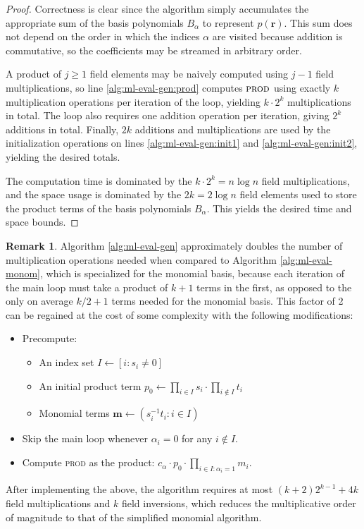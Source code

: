 \documentclass[12pt]{article}
\theoremstyle{plain}
\newcounter{documentcounter}
\theoremstyle{definition}
\newtheorem{remark}[documentcounter]{Remark}
\newcommand*{\av}[1]{\textsc{{#1}}}
\renewcommand*{\vec}[1]{{\mathbf{#1}}}
\begin{document}
\begin{proof}
  Correctness is clear since the algorithm simply accumulates the appropriate sum of the basis polynomials $B_\alpha$ to represent $p(\vec{r})$.  This sum does not depend on the order in which the indices $\alpha$ are visited because addition is commutative, so the coefficients may be streamed in arbitrary order.

  A product of $j \geq 1$ field elements may be naively computed using $j-1$ field multiplications, so line \ref{alg:ml-eval-gen:prod} computes $\av{prod}$ using exactly $k$ multiplication operations per iteration of the loop, yielding $k \cdot 2^k$ multiplications in total.  The loop also requires one addition operation per iteration, giving $2^k$ additions in total.  Finally, $2k$ additions and multiplications are used by the initialization operations on lines \ref{alg:ml-eval-gen:init1} and \ref{alg:ml-eval-gen:init2}, yielding the desired totals.

  The computation time is dominated by the $k \cdot 2^k = n \log n$ field multiplications, and the space usage is dominated by the $2k = 2 \log n$ field elements used to store the product terms of the basis polynomials $B_\alpha$.  This yields the desired time and space bounds.
\end{proof}

\begin{remark}
  \label{remark:alg:ml-eval-gen}
  Algorithm \ref{alg:ml-eval-gen} approximately doubles the number of multiplication operations needed when compared to Algorithm \ref{alg:ml-eval-monom}, which is specialized for the monomial basis, because each iteration of the main loop must take a product of $k+1$ terms in the first, as opposed to the only on average $k/2 + 1$ terms needed for the monomial basis.  This factor of 2 can be regained at the cost of some complexity with the following modifications:
  \begin{itemize}
    \item Precompute:
    \begin{itemize}
      \item An index set $I \gets [i : s_i \neq 0]$
      \item An initial product term $p_0 \gets \prod_{i \in I} s_i \cdot \prod_{i \notin I} t_i$
      \item Monomial terms $\vec{m} \gets (s_i^{-1} t_i : i \in I)$
    \end{itemize}
    \item Skip the main loop whenever $\alpha_i = 0$ for any $i \notin I$.
    \item Compute \av{prod} as the product: $c_\alpha \cdot p_0 \cdot \prod_{i \in I : \alpha_i = 1} m_i$.
  \end{itemize}
  After implementing the above, the algorithm requires at most $(k+2) 2^{k-1} + 4k$ field multiplications and $k$ field inversions, which reduces the multiplicative order of magnitude to that of the simplified monomial algorithm.
\end{remark}
\end{document}
